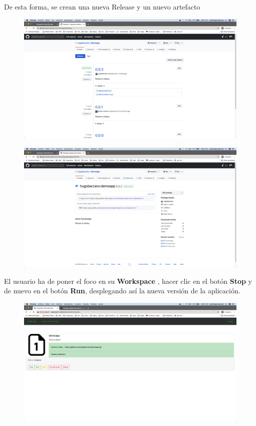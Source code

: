 \documentclass[a4paper,11pt]{book}
\begin{document}
De esta forma, se crean una nueva Release y un nuevo artefacto 

   \begin{figure}[H]
\centering
\includegraphics[scale=0.2]{imagenes/casouso/3_7.png}
\caption{   }
\end{figure}

   \begin{figure}[H]
\centering
\includegraphics[scale=0.2]{imagenes/casouso/3_8.png}
\caption{   }
\end{figure}


 El usuario ha de poner el foco en su \textbf{Workspace} , hacer clic en el botón \textbf{Stop} y de nuevo en el botón \textbf{Run}, desplegando así la nueva versión de la aplicación. 
 
\begin{figure}[H]
\centering
\includegraphics[scale=0.2]{imagenes/casouso/3_9.png}
\caption{   }
\end{figure}
 
\end{document}
